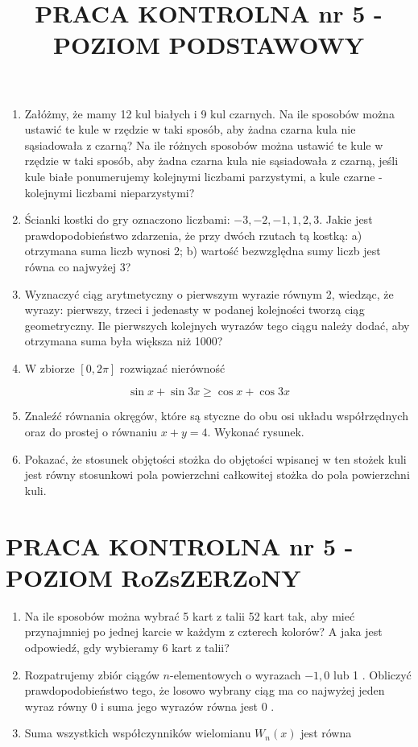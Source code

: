 \documentclass[10pt]{article}
\title{PRACA KONTROLNA nr 5 - POZIOM PODSTAWOWY }
\author{}
\date{}
\begin{document}
\maketitle
\begin{enumerate}
  \item Załóżmy, że mamy 12 kul białych i 9 kul czarnych. Na ile sposobów można ustawić te kule w rzędzie w taki sposób, aby żadna czarna kula nie sąsiadowała z czarną? Na ile różnych sposobów można ustawić te kule w rzędzie w taki sposób, aby żadna czarna kula nie sąsiadowała z czarną, jeśli kule białe ponumerujemy kolejnymi liczbami parzystymi, a kule czarne - kolejnymi liczbami nieparzystymi?
  \item Ścianki kostki do gry oznaczono liczbami: $-3,-2,-1,1,2,3$. Jakie jest prawdopodobieństwo zdarzenia, że przy dwóch rzutach tą kostką: a) otrzymana suma liczb wynosi 2; b) wartość bezwzględna sumy liczb jest równa co najwyżej 3?
  \item Wyznaczyć ciąg arytmetyczny o pierwszym wyrazie równym 2, wiedząc, że wyrazy: pierwszy, trzeci i jedenasty w podanej kolejności tworzą ciąg geometryczny. Ile pierwszych kolejnych wyrazów tego ciągu należy dodać, aby otrzymana suma była większa niż 1000?
  \item W zbiorze $[0,2 \pi]$ rozwiązać nierówność
\end{enumerate}

$$
\sin x+\sin 3 x \geqslant \cos x+\cos 3 x
$$

\begin{enumerate}
  \setcounter{enumi}{4}
  \item Znaleźć równania okręgów, które są styczne do obu osi układu współrzędnych oraz do prostej o równaniu $x+y=4$. Wykonać rysunek.
  \item Pokazać, że stosunek objętości stożka do objętości wpisanej w ten stożek kuli jest równy stosunkowi pola powierzchni całkowitej stożka do pola powierzchni kuli.
\end{enumerate}

\section*{PRACA KONTROLNA nr 5 - POZIOM RoZsZERZoNY}
\begin{enumerate}
  \item Na ile sposobów można wybrać 5 kart z talii 52 kart tak, aby mieć przynajmniej po jednej karcie w każdym z czterech kolorów? A jaka jest odpowiedź, gdy wybieramy 6 kart z talii?
  \item Rozpatrujemy zbiór ciągów $n$-elementowych o wyrazach $-1,0$ lub 1 . Obliczyć prawdopodobieństwo tego, że losowo wybrany ciąg ma co najwyżej jeden wyraz równy 0 i suma jego wyrazów równa jest 0 .
  \item Suma wszystkich współczynników wielomianu $W_{n}(x)$ jest równa
\end{enumerate}
\end{document}
